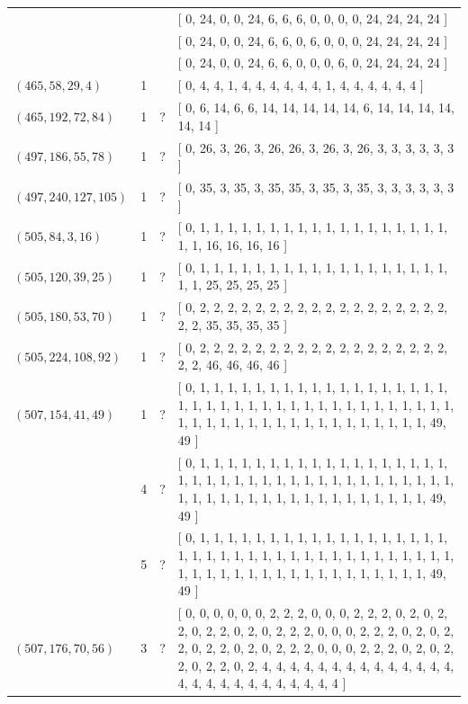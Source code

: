 \documentclass[12pt]{amsproc} %
\theoremstyle{definition}\newtheorem{defn}[thm]{Definition}
\theoremstyle{definition}\newtheorem{rem}[thm]{Remark}
\theoremstyle{definition}\newtheorem{ex}[thm]{Example}
\begin{document}
\begin{center}
\begin{longtable}{p{3.66cm}|P{0.8cm}|P{0.69cm}|p{10cm}}
		   &  &  & [ 0, 24, 0, 0, 24, 6, 6, 6, 0, 0, 0, 0, 24, 24, 24, 24 ] \\
		   &  &  & [ 0, 24, 0, 0, 24, 6, 6, 0, 6, 0, 0, 0, 24, 24, 24, 24 ] \\
		   &  &  & [ 0, 24, 0, 0, 24, 6, 6, 0, 0, 0, 6, 0, 24, 24, 24, 24 ] \\
		\hline
		 $(465, 58, 29, 4)$  & 1 & \cite{pol-dav-smi-swa} & [ 0, 4, 4, 1, 4, 4, 4, 4, 4, 4, 1, 4, 4, 4, 4, 4, 4 ] \\
		\hline
		 $(465, 192, 72, 84)$  & 1 & ? & [ 0, 6, 14, 6, 6, 14, 14, 14, 14, 14, 6, 14, 14, 14, 14, 14, 14 ] \\
		\hline
		 $(497, 186, 55, 78)$  & 1 & ? & [ 0, 26, 3, 26, 3, 26, 26, 3, 26, 3, 26, 3, 3, 3, 3, 3, 3 ] \\
		\hline
		 $(497, 240, 127, 105)$  & 1 & ? & [ 0, 35, 3, 35, 3, 35, 35, 3, 35, 3, 35, 3, 3, 3, 3, 3, 3 ] \\
		\hline
		 $(505, 84, 3, 16)$  & 1 & ? & [ 0, 1, 1, 1, 1, 1, 1, 1, 1, 1, 1, 1, 1, 1, 1, 1, 1, 1, 1, 1, 1, 16, 16, 16, 16 ] \\
		\hline
		 $(505, 120, 39, 25)$  & 1 & ? & [ 0, 1, 1, 1, 1, 1, 1, 1, 1, 1, 1, 1, 1, 1, 1, 1, 1, 1, 1, 1, 1, 25, 25, 25, 25 ] \\
		\hline
		 $(505, 180, 53, 70)$  & 1 & ? & [ 0, 2, 2, 2, 2, 2, 2, 2, 2, 2, 2, 2, 2, 2, 2, 2, 2, 2, 2, 2, 2, 35, 35, 35, 35 ] \\
		\hline
		 $(505, 224, 108, 92)$  & 1 & ? & [ 0, 2, 2, 2, 2, 2, 2, 2, 2, 2, 2, 2, 2, 2, 2, 2, 2, 2, 2, 2, 2, 46, 46, 46, 46 ] \\
		\hline
		 $(507, 154, 41, 49)$  & 1 & ? & [ 0, 1, 1, 1, 1, 1, 1, 1, 1, 1, 1, 1, 1, 1, 1, 1, 1, 1, 1, 1, 1, 1, 1, 1, 1, 1, 1, 1, 1, 1, 1, 1, 1, 1, 1, 1, 1, 1, 1, 1, 1, 1, 1, 1, 1, 1, 1, 1, 1, 1, 1, 1, 1, 1, 1, 1, 1, 49, 49 ] \\
		   & 4 & ? & [ 0, 1, 1, 1, 1, 1, 1, 1, 1, 1, 1, 1, 1, 1, 1, 1, 1, 1, 1, 1, 1, 1, 1, 1, 1, 1, 1, 1, 1, 1, 1, 1, 1, 1, 1, 1, 1, 1, 1, 1, 1, 1, 1, 1, 1, 1, 1, 1, 1, 1, 1, 1, 1, 1, 1, 1, 1, 49, 49 ] \\
		   & 5 & ? & [ 0, 1, 1, 1, 1, 1, 1, 1, 1, 1, 1, 1, 1, 1, 1, 1, 1, 1, 1, 1, 1, 1, 1, 1, 1, 1, 1, 1, 1, 1, 1, 1, 1, 1, 1, 1, 1, 1, 1, 1, 1, 1, 1, 1, 1, 1, 1, 1, 1, 1, 1, 1, 1, 1, 1, 1, 1, 49, 49 ] \\
		\hline
		 $(507, 176, 70, 56)$  & 3 & ? & [ 0, 0, 0, 0, 0, 0, 2, 2, 2, 0, 0, 0, 2, 2, 2, 0, 2, 0, 2, 2, 0, 2, 2, 0, 2, 0, 2, 2, 2, 0, 0, 0, 2, 2, 2, 0, 2, 0, 2, 2, 0, 2, 2, 0, 2, 0, 2, 2, 2, 0, 0, 0, 2, 2, 2, 0, 2, 0, 2, 2, 0, 2, 2, 0, 2, 4, 4, 4, 4, 4, 4, 4, 4, 4, 4, 4, 4, 4, 4, 4, 4, 4, 4, 4, 4, 4, 4, 4, 4, 4, 4 ] \\

\end{longtable}
\end{center}
\end{document}

